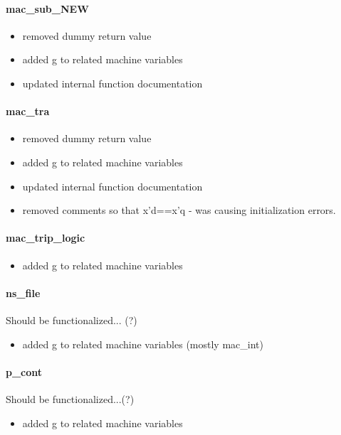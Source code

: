 \documentclass[12pt]{article}
\begin{document}
\paragraph{mac\_sub\_NEW}
	\begin{itemize}
		\item removed dummy return value
		\item added g to related machine variables
		\item updated internal function documentation
	\end{itemize}

\paragraph{mac\_tra}
	\begin{itemize}
		\item removed dummy return value
		\item added g to related machine variables
		\item updated internal function documentation
		\item removed comments so that x'd==x'q - was causing initialization errors.
	\end{itemize}

\paragraph{mac\_trip\_logic}
	\begin{itemize}
		\item added g to related machine variables
	\end{itemize}

\paragraph{ns\_file}
Should be functionalized... (?)
	\begin{itemize}
		\item added g to related machine variables (mostly mac\_int)
	\end{itemize}

\paragraph{p\_cont}
Should be functionalized...(?)
	\begin{itemize}
		\item added g to related machine variables
	\end{itemize}
\end{document}

